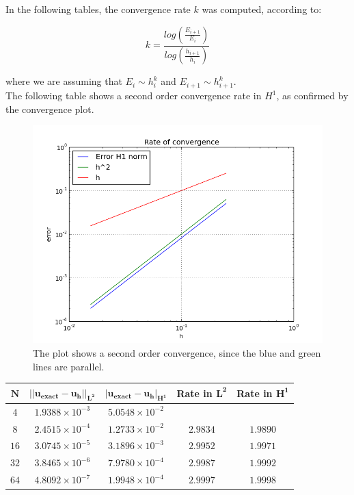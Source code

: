 \documentclass[11pt,a4paper,titlepage]{report}
\begin{document}
In the following tables, the convergence rate $k$ was computed, according to:

\[
k = \frac{log(\frac{E_{i+1}}{E_i})}{log(\frac{h_{i+1}}{h_i})}
\]

where we are assuming that $E_i \sim h^k_i$ and $E_{i+1} \sim h^k_{i+1}$. \\
The following table shows a second order convergence rate in $H^1$, as confirmed by the convergence plot.

\vspace{1cm}
\begin{figure}[h!]
\centering
\includegraphics[width=\textwidth]{images/convergence_sine}
\caption{The plot shows a second order convergence, since the blue and green lines are parallel.}
\end{figure}
\vspace{1cm}

\begin{center}
\begin{tabular}{| c | c | c | c | c |}
\hline
$  \mathbf{N}$ & $ \mathbf{|| u_{exact} - u_h ||_{L^2}}$ & $  \mathbf{ | u_{exact} - u_h |_{H^1}}$ & \textbf{Rate in }  $ \mathbf{L^2}$ & \textbf{Rate in } $  \mathbf{H^1}$  \\
\hline
$ 4 $ & $1.9388 \times 10^{-3}$ & $5.0548 \times 10^{-2}$  & & \\
\hline
$ 8$ & $2.4515  \times 10^{-4}$ & $1.2733 \times 10^{-2}$ &  $2.9834$ &  $1.9890$   \\
\hline
$ 16 $ & $ 3.0745 \times 10^{-5}$ & $3.1896 \times 10^{-3}$ & $ 2.9952 $ & $1.9971$   \\
\hline
$ 32$ & $3.8465 \times 10^{-6}$ & $7.9780 \times 10^{-4}$ & $ 2.9987 $ & $ 1.9992 $  \\
\hline
$ 64$ & $4.8092 \times 10^{-7}$ & $1.9948 \times 10^{-4}$  & $ 2.9997 $ & $1.9998$ \\
\hline
\end{tabular}
\end{center}
\end{document}
